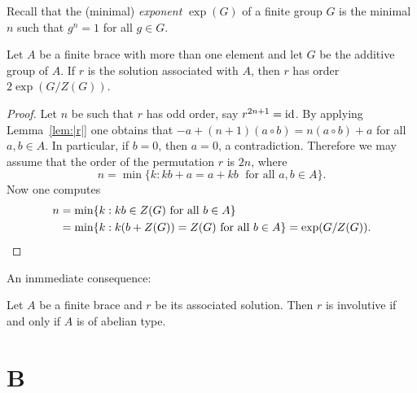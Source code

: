 Recall that the (minimal) \emph{exponent} $\exp(G)$ of a 
finite group $G$ is the minimal $n$ such that 
$g^n=1$ for all $g\in G$. 

\begin{theorem} 
\label{thm:|r|} 
  Let $A$ be a finite brace with more than one
  element and let $G$ be the additive group of $A$. 
  If $r$ is the solution associated with $A$, 
  then $r$ has order $2\exp(G/Z(G))$.
\end{theorem}

\begin{proof} 
  Let $n$ be such that $r$ has odd order, say $r^{2n+1}=\operatorname{id}$. By applying
  Lemma~\ref{lem:|r|} one obtains that $-a+(n+1)(a\circ b)=n(a\circ b)+a$
  for all $a,b\in A$. In particular, if $b=0$, then $a=0$, a contradiction. 
  Therefore we may assume that the order of the permutation $r$ is
  $2n$, where 
  \[
  n=\min\{k:kb+a=a+kb\;\text{ for all }a,b\in A\}.
  \]
  Now one computes
  \begin{align*} 
  n&=\min\{k:kb\in Z(G)\text{ for all }b\in A\}\\ 
  &=\min\{k:k(b+Z(G)) = Z(G)\text{ for all }b\in A\} =\exp(G/Z(G)).\qedhere
  \end{align*}
\end{proof}

An inmmediate consequence:

\begin{corollary}
    Let $A$ be a finite brace and $r$ be its associated solution. Then 
    $r$ is involutive if and only if $A$ is of abelian type.  
\end{corollary}




\section*{{{\thesection}B}}


